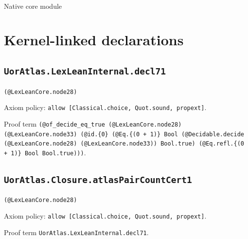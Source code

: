 \documentclass[11pt]{article}
\begin{document}
\begin{center}{\LARGE Native core module}\end{center}
\section*{Kernel-linked declarations}
\subsection*{\texttt{UorAtlas.LexLeanInternal.decl71}}
\noindent\texttt{(@LexLeanCore.node28)}\par
\noindent Axiom policy: \texttt{allow [Classical.choice, Quot.sound, propext]}.\par
\noindent Proof term \texttt{(@of\_decide\_eq\_true (@LexLeanCore.node28) (@LexLeanCore.node33) (@id.\{0\} (@Eq.\{(0 + 1)\} Bool (@Decidable.decide (@LexLeanCore.node28) (@LexLeanCore.node33)) Bool.true) (@Eq.refl.\{(0 + 1)\} Bool Bool.true)))}.\par
\subsection*{\texttt{UorAtlas.Closure.atlasPairCountCert1}}
\noindent\texttt{(@LexLeanCore.node28)}\par
\noindent Axiom policy: \texttt{allow [Classical.choice, Quot.sound, propext]}.\par
\noindent Proof term \texttt{UorAtlas.LexLeanInternal.decl71}.\par
\end{document}
